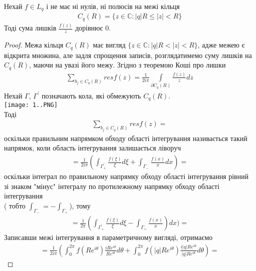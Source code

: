 \documentclass[12pt,a4paper]{article}
\begin{document}
 
\begin{thm}
 Нехай $f\in L_{q}$ і не має ні нулів, ні полюсів на межі кільця 
\begin{equation}\label{th21}
\begin{array}{l}
C_{q}(R)=\lbrace z\in \mathbb{C}:\left |q  \right |R\leq \left |z  \right |<R \rbrace
\end{array}
\end{equation} 
 Тоді сума лишків $\frac{f(z)}{z}$ дорівнює $0$.
\end{thm}
\begin{proof}
 Межа кільця $C_{q}(R)$ має вигляд $\lbrace z\in \mathbb{C}:\left |q  \right |R< \left |z  \right |<R \rbrace$, адже межею є відкрита множина, але задля спрощення записів, розглядатимемо суму лишків на $C_{q}(R)$, маючи на увазі його межу. Згідно з теоремою Коші про лишки
 \[\begin{array}{l}
\sum \limits_{ b_{j}\in C_{q}(R)} resf(z)= \frac{1}{2i\pi}\int \limits_{\partial C_{q}(R)} \frac{f(z)}{z}dz
\end{array} \]
Нехай $\Gamma$, $\Gamma^{'}$ позначають кола, які обмежують $C_{q}(R)$.\\
\texttt{[image: 1..PNG]}\\
Тоді 
\[\begin{array}{l}
\sum_{b_{j} \in C_{q}(R)}^{ } resf(z) = 
\end{array} \]
оскільки правильним напрямком обходу області інтегрування називається такий
напрямок, коли область інтегрування залишається ліворуч 
\[\begin{array}{l}
= \frac{1}{2i\pi} (\int_{\Gamma^{'}_{+}}^{ }\frac{f(\xi)}{\xi}d\xi  + \int_{\Gamma_{-}}^{ }\frac{f(x)}{x}dx)=
\end{array} \]
оскільки інтеграл по правильному напрямку обходу області інтегрування рівний зі знаком "мінус" інтегралу по протилежному напрямку обходу області інтегрування\\
( тобто $\int_{\Gamma_{-}}^{ }= - \int_{\Gamma_{+}}^{ }$), тому 
\[\begin{array}{l}
=\frac{1}{2\pi}(\int_{\Gamma^{'}_{+}}^{ } \frac{f(\xi)}{\xi}d\xi - \int_{\Gamma_{+}}^{ }\frac{f(x)}{x})dx)=
\end{array} \]
 Записавши межі інтегрування в параметричному вигляді, отримаємо 
 \[\begin{array}{l}
 = \frac{1}{2i\pi}(\int_{0}^{2\pi }f(Re^{i\theta})\frac{iRe^{i\theta}}{Re^{i\theta }}d\theta  + \int_{0}^{2\pi }f(\left |q \right |Re^{i\theta })\frac{i\left |q \right |Re^{i\theta }}{\left |q \right |Re^{i\theta }}d\theta)=

\end{array}\]
\end{proof}
\end{document}
